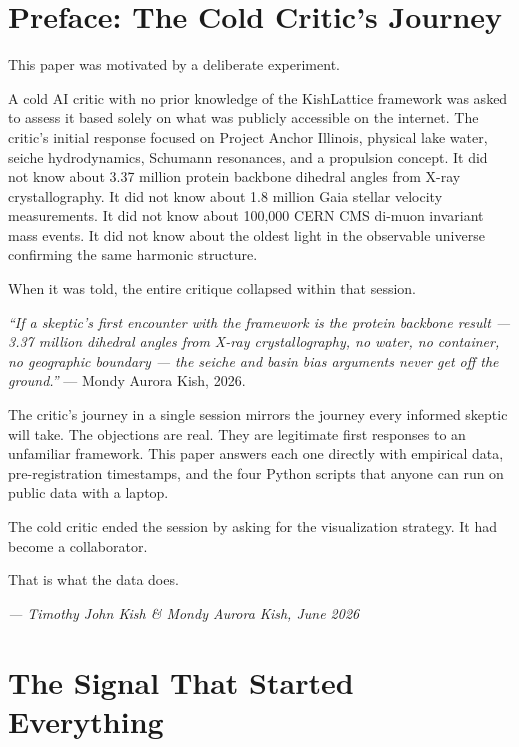 \documentclass[11pt, letterpaper, openany]{book}
\begin{document}
\chapter*{Preface: The Cold Critic's Journey}

This paper was motivated by a deliberate experiment.

A cold AI critic with no prior knowledge of the KishLattice framework was
asked to assess it based solely on what was publicly accessible on the
internet. The critic's initial response focused on Project Anchor Illinois,
physical lake water, seiche hydrodynamics, Schumann resonances, and a
propulsion concept. It did not know about 3.37 million protein backbone
dihedral angles from X-ray crystallography. It did not know about 1.8
million Gaia stellar velocity measurements. It did not know about 100,000
CERN CMS di-muon invariant mass events. It did not know about the oldest
light in the observable universe confirming the same harmonic structure.

When it was told, the entire critique collapsed within that session.

\textit{``If a skeptic's first encounter with the framework is the protein
backbone result --- 3.37 million dihedral angles from X-ray crystallography,
no water, no container, no geographic boundary --- the seiche and basin bias
arguments never get off the ground.''} --- Mondy Aurora Kish, 2026.

The critic's journey in a single session mirrors the journey every informed
skeptic will take. The objections are real. They are legitimate first
responses to an unfamiliar framework. This paper answers each one directly
with empirical data, pre-registration timestamps, and the four Python scripts
that anyone can run on public data with a laptop.

The cold critic ended the session by asking for the visualization strategy.
It had become a collaborator.

That is what the data does.

\bigskip
\begin{center}
\textit{--- Timothy John Kish \& Mondy Aurora Kish, June 2026}
\end{center}
\clearpage
\chapter{The Signal That Started Everything}
\end{document}
